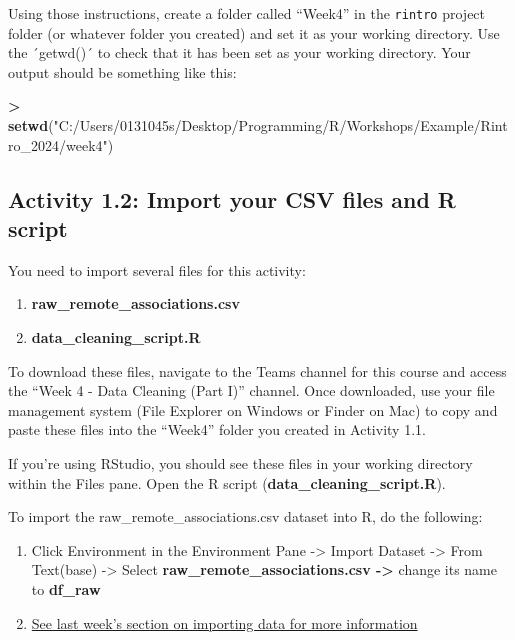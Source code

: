 \documentclass[
]{book}
\newenvironment{Shaded}{\begin{snugshade}}{\end{snugshade}}
\newcommand{\FunctionTok}[1]{\textcolor[rgb]{0.13,0.29,0.53}{\textbf{#1}}}
\newcommand{\NormalTok}[1]{#1}
\newcommand{\SpecialCharTok}[1]{\textcolor[rgb]{0.81,0.36,0.00}{\textbf{#1}}}
\newcommand{\StringTok}[1]{\textcolor[rgb]{0.31,0.60,0.02}{#1}}
\providecommand{\tightlist}{%
  \setlength{\itemsep}{0pt}\setlength{\parskip}{0pt}}
\begin{document}
Using those instructions, create a folder called ``Week4'' in the \texttt{rintro} project folder (or whatever folder you created) and set it as your working directory. Use the ´getwd()´ to check that it has been set as your working directory. Your output should be something like this:

\begin{Shaded}
\begin{Highlighting}[]
\SpecialCharTok{\textgreater{}} \FunctionTok{setwd}\NormalTok{(}\StringTok{"C:/Users/0131045s/Desktop/Programming/R/Workshops/Example/Rintro\_2024/week4"}\NormalTok{)}
\end{Highlighting}
\end{Shaded}

\hypertarget{activity-1.2-import-your-csv-files-and-r-script}{%
\subsection{Activity 1.2: Import your CSV files and R script}\label{activity-1.2-import-your-csv-files-and-r-script}}

You need to import several files for this activity:

\begin{enumerate}
\def\labelenumi{\arabic{enumi}.}
\item
  \textbf{raw\_remote\_associations.csv}
\item
  \textbf{data\_cleaning\_script.R}
\end{enumerate}

To download these files, navigate to the Teams channel for this course and access the ``Week 4 - Data Cleaning (Part I)'' channel. Once downloaded, use your file management system (File Explorer on Windows or Finder on Mac) to copy and paste these files into the ``Week4'' folder you created in Activity 1.1.

If you're using RStudio, you should see these files in your working directory within the Files pane. Open the R script (\textbf{data\_cleaning\_script.R}).

To import the raw\_remote\_associations.csv dataset into R, do the following:

\begin{enumerate}
\def\labelenumi{\arabic{enumi}.}
\tightlist
\item
  Click Environment in the Environment Pane -\textgreater{} Import Dataset -\textgreater{} From Text(base) -\textgreater{} Select \textbf{raw\_remote\_associations.csv -\textgreater{}} change its name to \textbf{df\_raw}
\item
  \protect\hyperlink{importing}{See last week's section on importing data for more information}
\end{enumerate}
\end{document}
